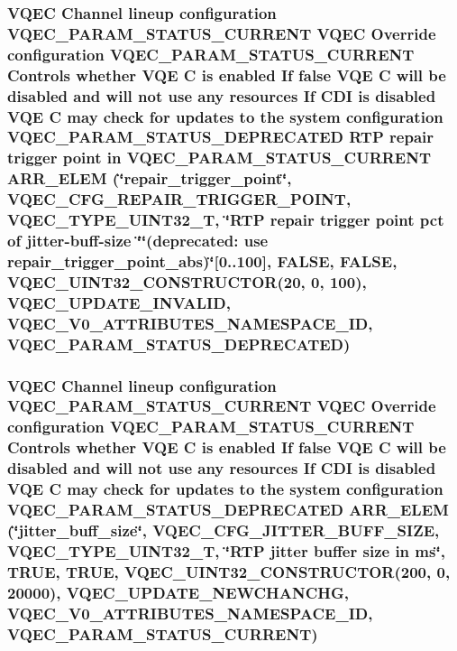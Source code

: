 \subsubsection{\setlength{\rightskip}{0pt plus 5cm}VQEC Channel lineup configuration VQEC\_\-PARAM\_\-STATUS\_\-CURRENT VQEC Override configuration VQEC\_\-PARAM\_\-STATUS\_\-CURRENT Controls whether VQE \bf{C} is enabled If false VQE \bf{C} will be disabled and will not use any resources If CDI is disabled VQE \bf{C} may check for updates \bf{to} the system configuration VQEC\_\-PARAM\_\-STATUS\_\-DEPRECATED RTP repair trigger point in VQEC\_\-PARAM\_\-STATUS\_\-CURRENT ARR\_\-ELEM (\char`\"{}repair\_\-trigger\_\-point\char`\"{}, VQEC\_\-CFG\_\-REPAIR\_\-TRIGGER\_\-POINT, \bf{VQEC\_\-TYPE\_\-UINT32\_\-T}, \char`\"{}RTP repair trigger point pct of jitter-buff-size  \char`\"{}\char`\"{}(deprecated: use repair\_\-trigger\_\-point\_\-abs)\char`\"{}[0..100], \bf{FALSE}, \bf{FALSE}, VQEC\_\-UINT32\_\-CONSTRUCTOR(20, 0, 100), \bf{VQEC\_\-UPDATE\_\-INVALID}, \bf{VQEC\_\-V0\_\-ATTRIBUTES\_\-NAMESPACE\_\-ID}, VQEC\_\-PARAM\_\-STATUS\_\-DEPRECATED)}\label{vqec__cfg__settings_8h_c0ad2979bcb7fb6c4d9ad0769e04dc4b}


\subsubsection{\setlength{\rightskip}{0pt plus 5cm}VQEC Channel lineup configuration VQEC\_\-PARAM\_\-STATUS\_\-CURRENT VQEC Override configuration VQEC\_\-PARAM\_\-STATUS\_\-CURRENT Controls whether VQE \bf{C} is enabled If false VQE \bf{C} will be disabled and will not use any resources If CDI is disabled VQE \bf{C} may check for updates \bf{to} the system configuration VQEC\_\-PARAM\_\-STATUS\_\-DEPRECATED ARR\_\-ELEM (\char`\"{}jitter\_\-buff\_\-size\char`\"{}, VQEC\_\-CFG\_\-JITTER\_\-BUFF\_\-SIZE, \bf{VQEC\_\-TYPE\_\-UINT32\_\-T}, \char`\"{}RTP jitter buffer size in \bf{ms}\char`\"{}, \bf{TRUE}, \bf{TRUE}, VQEC\_\-UINT32\_\-CONSTRUCTOR(200, 0, 20000), \bf{VQEC\_\-UPDATE\_\-NEWCHANCHG}, \bf{VQEC\_\-V0\_\-ATTRIBUTES\_\-NAMESPACE\_\-ID}, VQEC\_\-PARAM\_\-STATUS\_\-CURRENT)}\label{vqec__cfg__settings_8h_ac6bc27cfa5ef82783edc4dba843b105}



